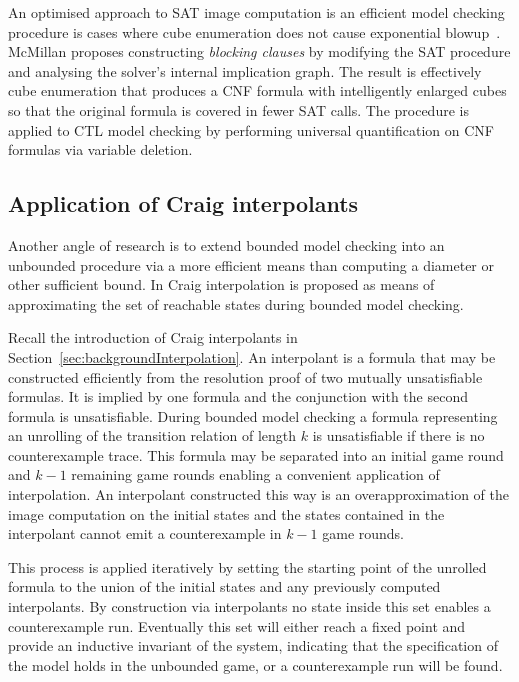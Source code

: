 An optimised approach to SAT image computation is an efficient model checking procedure is cases where cube enumeration does not cause exponential blowup~\cite{McMillan02}. McMillan proposes constructing \emph{blocking clauses} by modifying the SAT procedure and analysing the solver's internal implication graph. The result is effectively cube enumeration that produces a CNF formula with intelligently enlarged cubes so that the original formula is covered in fewer SAT calls. The procedure is applied to CTL model checking by performing universal quantification on CNF formulas via variable deletion.

\subsection{Application of Craig interpolants}

Another angle of research is to extend bounded model checking into an unbounded procedure via a more efficient means than computing a diameter or other sufficient bound. In \cite{McMillan03} Craig interpolation is proposed as means of approximating the set of reachable states during bounded model checking. 

Recall the introduction of Craig interpolants in Section~\ref{sec:backgroundInterpolation}. An interpolant is a formula that may be constructed efficiently from the resolution proof of two mutually unsatisfiable formulas. It is implied by one formula and the conjunction with the second formula is unsatisfiable. During bounded model checking a formula representing an unrolling of the transition relation of length $k$ is unsatisfiable if there is no counterexample trace. This formula may be separated into an initial game round and $k-1$ remaining game rounds enabling a convenient application of interpolation. An interpolant constructed this way is an overapproximation of the image computation on the initial states and the states contained in the interpolant cannot emit a counterexample in $k-1$ game rounds.

This process is applied iteratively by setting the starting point of the unrolled formula to the union of the initial states and any previously computed interpolants. By construction via interpolants no state inside this set enables a counterexample run. Eventually this set will either reach a fixed point and provide an inductive invariant of the system, indicating that the specification of the model holds in the unbounded game, or a counterexample run will be found.

